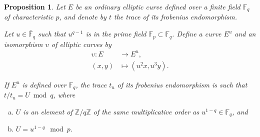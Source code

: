 \documentclass[12pt]{article}
\theoremstyle{plain}
\newtheorem{proposition}[theorem]{Proposition}
\theoremstyle{definition}
\def\Z{\ensuremath{\mathbb{Z}}}
\def\F{\ensuremath{\mathbb{F}}}
\begin{document}
\begin{proposition}
  \label{proposition:twisttrace}
  Let $E$ be an ordinary elliptic curve defined over a finite field
  $\F_q$ of characteristic $p$, and denote by $t$ the trace of its
  frobenius endomorphism.

  Let $u\in\bar{\F}_q$ such that $u^{q-1}$ is in the prime field
  $\F_p\subset\F_q$. Define a curve $E^u$ and an isomorphism
  $\upsilon$ of elliptic curves by
  \begin{equation*}
    \begin{aligned}
      \upsilon : E &\to E^u,\\
      (x,y) &\mapsto (u^2x,u^3y).
    \end{aligned}
  \end{equation*}
  
  If $E^u$ is defined over $\F_q$, the trace $t_u$ of its frobenius
  endomorphism is such that $t/t_u=U\bmod q$, where
  \begin{enumerate}[a)]
  \item $U$ is an element of $\Z/q\Z$ of the same multiplicative order
    as $u^{1-q}\in\F_q$, and
  \item $U=u^{1-q}\mod p$.
  \end{enumerate}
\end{proposition}
\end{document}
